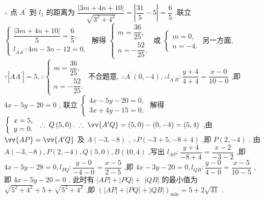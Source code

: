 $\therefore$ 点 ${A}^{\prime }$ 到 ${l}_{1}$ 的距离为 $\dfrac{\left| 3m + 4n + {10}\right| }{\sqrt{{3}^{2} + {4}^{2}}} = \left| {\dfrac{31}{5} - 5}\right|  = \dfrac{6}{5}$ ,联立 $\left\{  \begin{array}{l} \dfrac{\left| 3m + 4n + {10}\right| }{5} = \dfrac{6}{5}, \\  {l}_{A{A}^{\prime }} : {4m} - {3n} - {12} = 0, \end{array}\right.$ 解得 $\left\{  \begin{array}{l} m = \dfrac{36}{25}, \\  n =  - \dfrac{52}{25}, \end{array}\right.$ 或 $\left\{  \begin{array}{l} m = 0, \\  n =  - 4. \end{array}\right.$ 另一方面, $\because \left| {A{A}^{\prime }}\right|  = 5,\therefore \left\{  \begin{array}{l} m = \dfrac{36}{25}, \\  n =  - \dfrac{52}{25}. \end{array}\right.$ 不合题意, $\therefore {A}^{\prime }\left( {0, - 4}\right) ,\therefore {l}_{{A}^{\prime }B} : \dfrac{y + 4}{4 + 4} = \dfrac{x - 0}{{10} - 0}$ ,即 ${4x} - {5y} - {20} = 0$ , 联立 $\left\{  \begin{array}{l} {4x} - {5y} - {20} = 0, \\  {3x} + {4y} - {15} = 0, \end{array}\right.$ 解得 $\left\{  {\begin{array}{l} x = 5, \\  y = 0. \end{array}\;\therefore \;Q\left( {5,0}\right) .\;\therefore \;\vv{{A}^{\prime }Q} = \left( {5,0}\right)  - \left( {0, - 4}\right)  = \left( {5,4}\right) }\right.$ ,由 $\vv{AP} = \vv{{A}^{\prime }Q}$ 及 $A\left( {-3, - 8}\right)$ , $\therefore P\left( {-3 + 5, - 8 + 4}\right)$ ,即 $P\left( {2, - 4}\right)$ . 由 $A\left( {-3, - 8}\right) ,P\left( {2, - 4}\right) ,Q\left( {5,0}\right) ,B\left( {{10},4}\right)$ ,写出 ${l}_{AP} : \dfrac{y + 4}{-8 + 4} = \dfrac{x - 2}{-3 - 2}$ ,即 ${4x} - {5y} - {28} = 0,{l}_{PQ} : \dfrac{y - 0}{-4 - 0} = \dfrac{x - 5}{2 - 5}$ ,即 ${4x} - {3y} - {20} = 0,{l}_{QB} : \dfrac{y - 0}{4 - 0} = \dfrac{x - 5}{{10} - 5}$ ,即 ${4x} - {5y} - {20} = 0$ . 此时有 $\left| {AP}\right|  + \left| {PQ}\right|  +$  $\left| {QB}\right|$ 的最小值为 $\sqrt{{5}^{2} + {4}^{2}} + 5 + \sqrt{{5}^{2} + {4}^{2}}$ ,即 ${\left( \left| AP\right|  + \left| PQ\right|  + \left| QB\right| \right) }_{\min } = 5 + 2\sqrt{41}$ .

